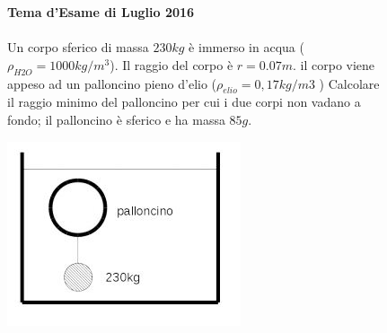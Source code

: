 \begin{figure}[h!]
	\textbf{Tema d'Esame di Luglio 2016}\\ \\
	Un corpo sferico di massa $230 kg$ è immerso in acqua ($\rho_{H2O} = 1000kg/m^3 $). Il raggio del corpo
	è $r = 0.07 m$. il corpo viene appeso ad un palloncino pieno d'elio ($\rho_{elio} = 0,17 kg/m3$ ) Calcolare il raggio minimo del palloncino per cui i due corpi non vadano a fondo; il palloncino è sferico e ha massa $85g$.
	\begin{center}
			\includegraphics[scale=1.1]{ES4/GIU042016.jpg}
	\end{center}
\end{figure}